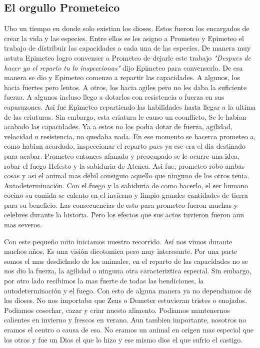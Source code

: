 \documentclass[12pt]{exam}
\begin{document}
\begin{multicols}{2}
\subsection*{El orgullo Prometeico}
Ubo un tiempo en donde solo existian los dioses. Estos fueron los encargados de crear la vida y las especies. Entre ellos
se les asigno a Prometeo y Epimeteo el trabajo de distribuir las capacidades a cada una de las especies. De manera muy
astuta Epimeteo logro convenser a Prometeo de dejarle este trabajo \textit{"Despues de hacer yo el reparto tu lo inspeccionas"}
dijo Epimeteo para convenserlo. De esa manera se dio y Epimeteo comenzo a repartir las capacidades. A algunos, los hacia fuertes
pero lentos. A otros, los hacia agiles pero no les daba la suficiente fuerza. A algunos incluso llego a dotarlos con resistencia
o fuerza en sus caparazones. Asi fue Epimeteo repartiendo las habilidades hasta llegar a la ultima de las criuturas. Sin embargo,
esta criatura le causo un coonflicto, Se le habian acabado las capacidades. Ya a estos no los podia dotar de fuerza, agilidad,
velocidad o resistencia, no quedaba nada. En ese momento se hacerca prometeo a, como habian acordado, inspeccionar el
reparto pues ya ese era el dia destinado para acabar. Prometeo entonces afanado y preocupado se le ocurre una idea, robar
el fuego Hefesto y la sabiduria de Atenea. Asi fue, prometeo robo ambas cosas y asi el animal mas debil consiguio aquello
que ninguno de los otros tenia. Autodeterminación. Con el fuego y la sabiduria de como hacerlo, el ser humano cocino su comida
se calento en el invierno y limpio grandes cantidades de tierra para su beneficio. Las consecuencias de esto para prometeo
fueron muchas y celebres durante la historia. Pero los efectos que sus actos tuvieron fueron aun mas severos.

Con este pequeño mito iniciamos nuestro recorrido. Así nos vimos durante muchos años. Es una visión dicotomica pero muy interesante.
Por una parte somos el mas desdichado de los animales, en el reparto de las capacidades no se nos dio la fuerza, la agilidad o
ninguna otra caracteriztica especial. Sin embargo, por otro lado recibimos la mas fuerte de todas las bendiciones, 
la autodeterminación y el fuego. Con esto de alguna manera ya no dependiamos de los dioses. No nos importaba que Zeus o Demeter
estuvieran tristes o enojados. Podiamos cosechar, cazar y criar nuesto alimento. Podiamos mantenernos calientes en invierno
y frescos en verano. Aun tambien importante, nosotros no eramos el centro o causa de eso. No eramos un animal en origen mas
especial que los otros y fue un Dios el que lo hizo y ese mismo dios el que sufrio el castigo.

\end{multicols}
\end{document}
